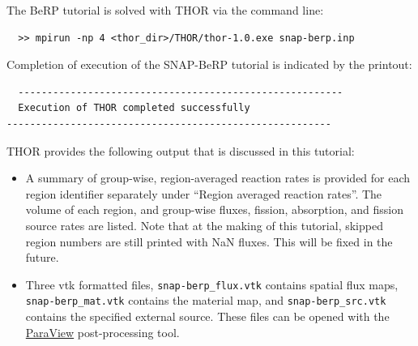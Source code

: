 The BeRP tutorial is solved with \ac{THOR} via the command line:
\begin{verbatim}
  >> mpirun -np 4 <thor_dir>/THOR/thor-1.0.exe snap-berp.inp
\end{verbatim}

Completion of execution of the SNAP-BeRP tutorial is indicated by the printout:
\begin{verbatim}
  --------------------------------------------------------
  Execution of THOR completed successfully
--------------------------------------------------------
\end{verbatim}

\ac{THOR} provides the following output that is discussed in this tutorial:
\begin{itemize}
    \item A summary of group-wise, region-averaged reaction rates is provided for each region identifier separately under ``Region averaged reaction rates''.
    The volume of each region, and group-wise fluxes, fission, absorption, and fission source rates are listed.
    Note that at the making of this tutorial, skipped region numbers are still printed with NaN fluxes.
    This will be fixed in the future.
    \item Three vtk formatted files, \verb"snap-berp_flux.vtk" contains spatial flux maps, \\
    \verb"snap-berp_mat.vtk" contains the material map, and \verb"snap-berp_src.vtk" contains the specified external source.
    These files can be opened with the \href{https://www.paraview.org/download/}{ParaView} post-processing tool.
\end{itemize}

